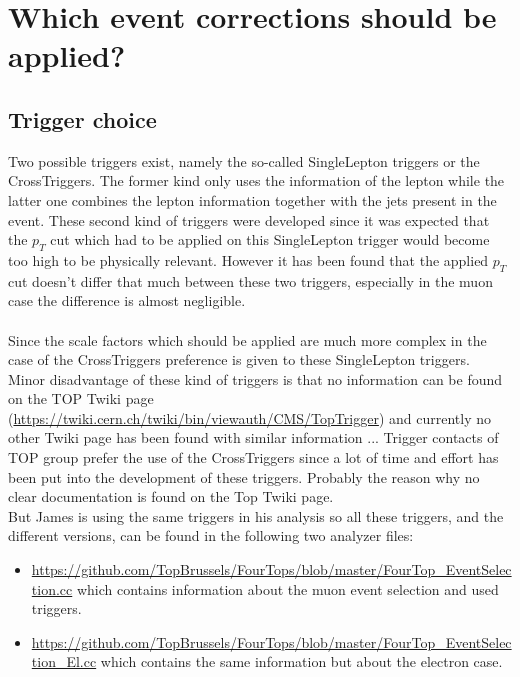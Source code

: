 \documentclass[a4paper,12pt]{report}
\begin{document}
\section{Which event corrections should be applied?}

\subsection{Trigger choice}
Two possible triggers exist, namely the so-called SingleLepton triggers or the CrossTriggers. The former kind only uses the information of the lepton while the latter one combines the lepton information together with the jets present in the event. These second kind of triggers were developed since it was expected that the $p_T$ cut which had to be applied on this SingleLepton trigger would become too high to be physically relevant. However it has been found that the applied $p_T$ cut doesn't differ that much between these two triggers, especially in the muon case the difference is almost negligible.\\
\\
Since the scale factors which should be applied are much more complex in the case of the CrossTriggers preference is given to these SingleLepton triggers.\\
Minor disadvantage of these kind of triggers is that no information can be found on the TOP Twiki page (\url{https://twiki.cern.ch/twiki/bin/viewauth/CMS/TopTrigger}) and currently no other Twiki page has been found with similar information ... Trigger contacts of TOP group prefer the use of the CrossTriggers since a lot of time and effort has been put into the development of these triggers. Probably the reason why no clear documentation is found on the Top Twiki page.\\
But James is using the same triggers in his analysis so all these triggers, and the different versions, can be found in the following two analyzer files:
\begin{itemize}
 \item \url{https://github.com/TopBrussels/FourTops/blob/master/FourTop_EventSelection.cc} which contains information about the muon event selection and used triggers.
 \item \url{https://github.com/TopBrussels/FourTops/blob/master/FourTop_EventSelection_El.cc} which contains the same information but about the electron case.
\end{itemize}
\end{document}
